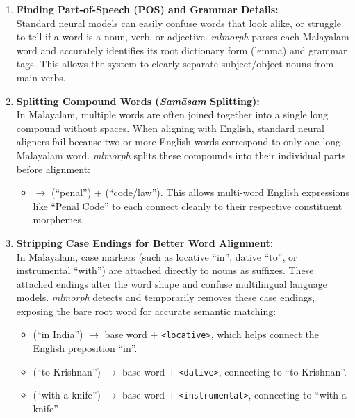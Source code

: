 \begin{enumerate}
    \item \textbf{Finding Part-of-Speech (POS) and Grammar Details:}\\
    Standard neural models can easily confuse words that look alike, or struggle to tell if a word is a noun, verb, or adjective. \textit{mlmorph} parses each Malayalam word and accurately identifies its root dictionary form (lemma) and grammar tags. This allows the system to clearly separate subject/object nouns from main verbs.

    \item \textbf{Splitting Compound Words (\textit{Samāsam} Splitting):}\\
    In Malayalam, multiple words are often joined together into a single long compound without spaces. When aligning with English, standard neural aligners fail because two or more English words correspond to only one long Malayalam word. \textit{mlmorph} splits these compounds into their individual parts before alignment:
    \begin{itemize}[noitemsep]
        \item {} $\longrightarrow$  (``penal'') $+$  (``code/law''). This allows multi-word English expressions like ``Penal Code'' to each connect cleanly to their respective constituent morphemes.
    \end{itemize}

    \item \textbf{Stripping Case Endings for Better Word Alignment:}\\
    In Malayalam, case markers (such as locative ``in'', dative ``to'', or instrumental ``with'') are attached directly to nouns as suffixes. These attached endings alter the word shape and confuse multilingual language models. \textit{mlmorph} detects and temporarily removes these case endings, exposing the bare root word for accurate semantic matching:
    \begin{itemize}[noitemsep]
        \item {} (``in India'') $\longrightarrow$ base word  $+$ \texttt{<locative>}, which helps connect the English preposition ``in''.
        \item {} (``to Krishnan'') $\longrightarrow$ base word  $+$ \texttt{<dative>}, connecting to ``to Krishnan''.
        \item {} (``with a knife'') $\longrightarrow$ base word  $+$ \texttt{<instrumental>}, connecting to ``with a knife''.
    \end{itemize}


\end{enumerate}

